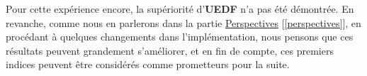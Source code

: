 	Pour cette expérience encore, la supériorité d'\textbf{UEDF} n'a pas été démontrée.
	En revanche, comme nous en parlerons dans la partie \hyperref[contexte]{Perspectives} [\ref*{perspectives}], en procédant à quelques changements dans l'implémentation, 
	nous pensons que ces résultats peuvent grandement s'améliorer, et en fin de compte, ces premiers indices peuvent être 
	considérés comme prometteurs pour la suite.

		
		

	